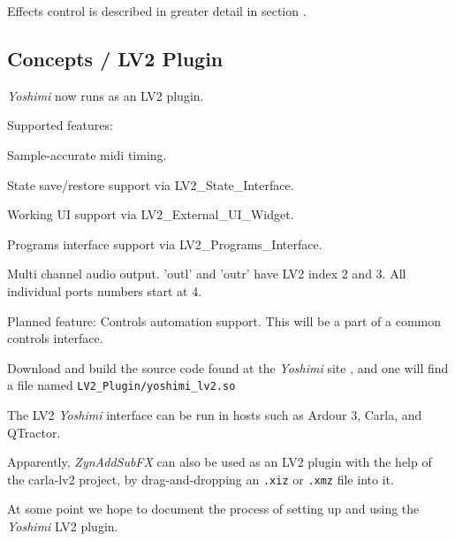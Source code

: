    Effects control is described in greater detail in section
   .

\subsection{Concepts / LV2 Plugin}
\label{subsec:concepts_lv2_plugin}

   \textsl{Yoshimi} now runs as an LV2 plugin.

Supported features:

   \begin{enumber}
      \item Sample-accurate midi timing.
      \item State save/restore support via LV2\_State\_Interface.
      \item Working UI support via LV2\_External\_UI\_Widget.
      \item Programs interface support via LV2\_Programs\_Interface.
      \item Multi channel audio output. 'outl' and 'outr' have LV2 index 2
         and 3. All individual ports numbers start at 4.
   \end{enumber}

   Planned feature: Controls automation support. This will be a part of a
   common controls interface.

   Download and build the source code found at the
   \textsl{Yoshimi} site \cite{yoshimi},
   and one will find a file named
   \texttt{LV2\_Plugin/yoshimi\_lv2.so}

   The LV2 \textsl{Yoshimi} interface can be run in hosts such as
   Ardour 3, Carla, and QTractor.

   Apparently, \textsl{ZynAddSubFX} can also be used as an LV2 plugin with
   the help of the carla-lv2 project, by drag-and-dropping an
   \texttt{.xiz} or \texttt{.xmz} file into it.

   At some point we hope to document the process of setting up and using
   the \textsl{Yoshimi} LV2 plugin.

